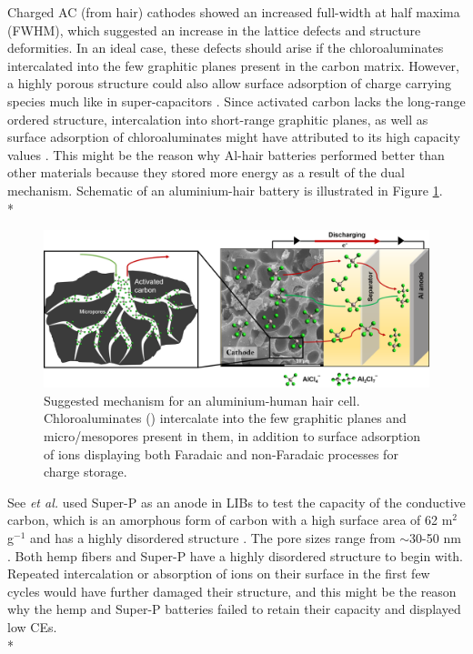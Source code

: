 Charged AC (from hair) cathodes showed an increased full-width at half maxima (FWHM), which suggested an increase in the lattice defects and structure deformities. In an ideal case, these defects should arise if the chloroaluminates intercalated into the few graphitic planes present in the carbon matrix. However, a highly porous structure could also allow surface adsorption of charge carrying species much like in super-capacitors \cite{beguin_carbons_2014}. Since activated carbon lacks the long-range ordered structure, intercalation into short-range graphitic planes, as well as surface adsorption of chloroaluminates might have attributed to its high capacity values \cite{brezesinski_ordered_2010}. This might be the reason why Al-hair batteries performed better than other materials because they stored more energy as a result of the dual mechanism. Schematic of an aluminium-hair battery is illustrated in Figure \ref{Figures/chap5fig:achmech}.\\*

 \begin{figure}[h!]
  \centering
  \includegraphics[width=\textwidth]{Figures/chap5fig/achmech}
    \caption{Suggested mechanism for an aluminium-human hair cell. Chloroaluminates () intercalate into the few graphitic planes and micro/mesopores present in them, in addition to surface adsorption of ions displaying both Faradaic and non-Faradaic processes for charge storage.}
  \label{Figures/chap5fig:achmech}
\end{figure}
See \textit{et al.} used Super-P as an anode in LIBs to test the capacity of the conductive carbon, which is an amorphous form of carbon with a high surface area of 62 m$^2$ g$^{-1}$ and has a highly disordered structure \cite{see_reversible_2017}. The pore sizes range from $\sim$30-50 nm \cite{younesi_analysis_2015}. Both hemp fibers and Super-P have a highly disordered structure to begin with. Repeated intercalation or absorption of ions on their surface in the first few cycles would have further damaged their structure, and this might be the reason why the hemp and Super-P batteries failed to retain their capacity and displayed low CEs. \\*

